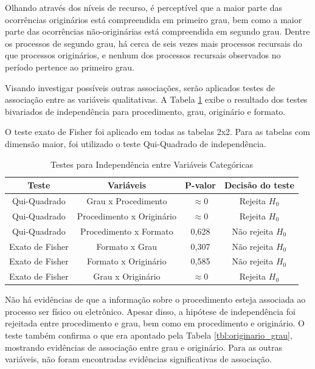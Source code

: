 Olhando através dos níveis de recurso, é perceptível que a maior parte das ocorrências originários está compreendida em primeiro grau, bem como a maior parte das ocorrências não-originárias está compreendida em segundo grau. Dentre os processos de segundo grau, há cerca de seis vezes mais processos recursais do que processos originários, e nenhum dos processos recursais observados no período pertence ao primeiro grau.

Visando investigar possíveis outras associações, serão aplicados testes de associação entre as variáveis qualitativas. A Tabela \ref{tbl:assoc_categoricas} exibe o resultado dos testes bivariados de independência para procedimento, grau, originário e formato.

O teste exato de Fisher foi aplicado em todas as tabelas 2x2. Para as tabelas com dimensão maior, foi utilizado o teste Qui-Quadrado de independência.

\begin{table}[H]
\centering
\caption{Testes para Independência entre Variáveis Categóricas}
\begin{tabular}{cccc}
\hline
\textbf{Teste} & \textbf{Variáveis} & \textbf{P-valor} & \textbf{Decisão do teste} \\ \hline
Qui-Quadrado & Grau x Procedimento & $\approx 0$   & Rejeita $H_0$  \\
Qui-Quadrado & Procedimento x Originário & $\approx 0$   & Rejeita $H_0$  \\
Qui-Quadrado & Procedimento x Formato & 0,628   & Não rejeita $H_0$  \\
Exato de Fisher & Formato x Grau & 0,307 & Não rejeita $H_0$  \\
Exato de Fisher & Formato x Originário & 0,585 & Não rejeita $H_0$  \\
Exato de Fisher & Grau x Originário & $\approx 0$   & Rejeita $H_0$  \\ \hline 
\end{tabular}
\label{tbl:assoc_categoricas}
\end{table}

Não há evidências de que a informação sobre o procedimento esteja associada ao processo ser físico ou eletrônico. Apesar disso, a hipótese de independência foi rejeitada entre procedimento e grau, bem como em procedimento e originário. O teste também confirma o que era apontado pela Tabela \ref{tbl:originario_grau}, mostrando evidências de associação entre grau e originário. Para as outras variáveis, não foram encontradas evidências significativas de associação.


